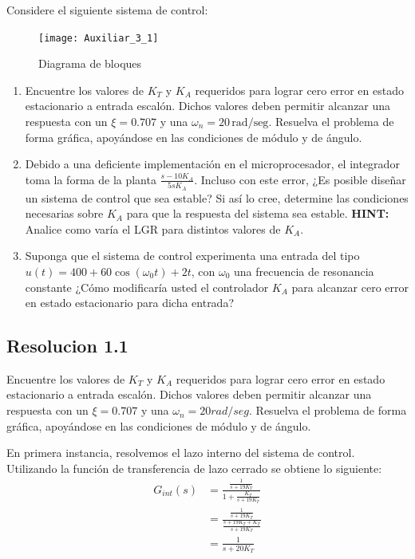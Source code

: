 \documentclass[
  11pt,
  letterpaper,
   addpoints,
   answers
  ]{exam}
\begin{document}
\begin{questions}
    \question Considere el siguiente sistema de control:
    \begin{figure}[h]
        \centering
        \texttt{[image: Auxiliar\_3\_1]}
        \caption{Diagrama de bloques}
    \end{figure}
    \begin{enumerate}
        \item Encuentre los valores de $K_T$ y $K_A$ requeridos para lograr cero error en estado estacionario a entrada escalón. Dichos valores deben permitir alcanzar una respuesta con un $\xi = 0.707$ y una $\omega_n = 20 \, \text{rad/seg}$. Resuelva el problema de forma gráfica, apoyándose en las condiciones de módulo y de ángulo.
        \item Debido a una deficiente implementación en el microprocesador, el integrador toma la forma de la planta $\frac{s-10K_A}{5sK_A}$. Incluso con este error, ¿Es posible diseñar un sistema de control que sea estable? Si así lo cree, determine las condiciones necesarias sobre $K_A$ para que la respuesta del sistema sea estable. \textbf{HINT:} Analice como varía el LGR para distintos valores de $K_A$.
        \item Suponga que el sistema de control experimenta una entrada del tipo $u(t) = 400 + 60 \cos (\omega_0 t) + 2t$, con $\omega_0$ una frecuencia de resonancia constante ¿Cómo modificaría usted el controlador $K_A$ para alcanzar cero error en estado estacionario para dicha entrada?
    \end{enumerate}
    
\begin{solution}
\subsection*{Resolucion 1.1}
Encuentre los valores de $K_T$ y $K_A$ requeridos para lograr cero error en estado estacionario a entrada escalón. Dichos valores deben permitir alcanzar una respuesta con un $\xi=0.707$ y una $\omega_n=20 rad/seg$. Resuelva el problema de forma gráfica, apoyándose en las condiciones de módulo y de ángulo.

En primera instancia, resolvemos el lazo interno del sistema de control. Utilizando la función de transferencia de lazo cerrado se obtiene lo siguiente:
\begin{align}
    G_{int}(s)&=\frac{\frac{1}{s+19K_T}}{1+ \frac{K_T}{s+19K_T}} \nonumber \\
    &=\frac{\frac{1}{s+19K_T}}{\frac{s+19K_T+K_T}{s+19K_T}} \nonumber \\
    &=\frac{1}{s+20K_T} \nonumber
\end{align}


\end{solution}
\end{questions}
\end{document}
